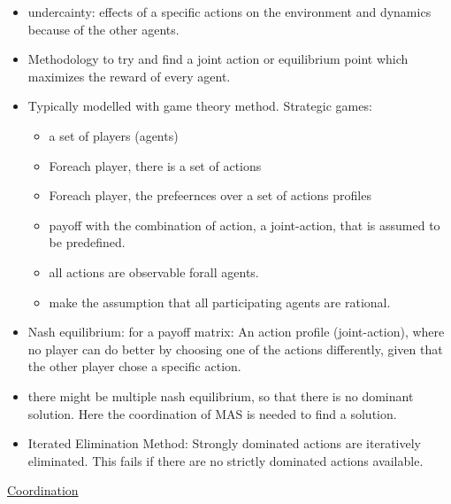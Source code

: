 \begin{itemize}[noitemsep,nolistsep]
	\item undercainty: effects of a specific actions on the environment and dynamics because of the other agents.
	\item Methodology to try and find a joint action or equilibrium point which maximizes the reward of every agent.
	\item Typically modelled with game theory method. Strategic games:
	\begin{itemize}[noitemsep,nolistsep]
		\item a set of players (agents)
		\item Foreach player, there is a set of actions
		\item Foreach player, the prefeernces over a set of actions profiles
		\item payoff with the combination of action, a joint-action, that is assumed to be predefined.
		\item all actions are observable forall agents.
		\item make the assumption that all participating agents are rational.
	\end{itemize}
	\item Nash equilibrium: for a payoff matrix: An action profile (joint-action), where no player can do better by choosing one of the actions differently, given that the other player chose a specific action.
	\item there might be multiple nash equilibrium, so that there is no dominant solution. Here the coordination of MAS is needed to find a solution.
	\item Iterated Elimination Method: Strongly dominated actions are iteratively eliminated. This fails if there are no strictly dominated actions available.
\end{itemize}
\underline{Coordination}
